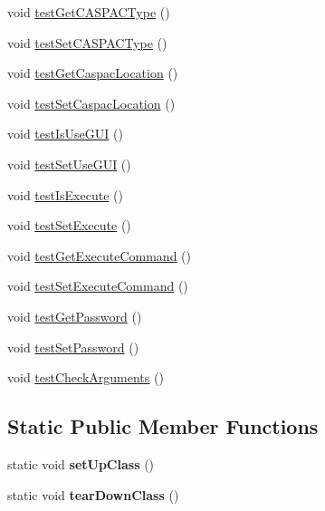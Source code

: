 \begin{DoxyCompactItemize}
\item 
void \hyperlink{class_c_a_s_u_a_l_1_1_c_a_s_u_a_l_settings_test_a80f2a239ee4bc31906209530c5e57f3e}{test\-Get\-C\-A\-S\-P\-A\-C\-Type} ()
\item 
void \hyperlink{class_c_a_s_u_a_l_1_1_c_a_s_u_a_l_settings_test_a4d50bccc0ef0264dac5cdf352ae3fb92}{test\-Set\-C\-A\-S\-P\-A\-C\-Type} ()
\item 
void \hyperlink{class_c_a_s_u_a_l_1_1_c_a_s_u_a_l_settings_test_a9df1e7305773780940e940e5dcdac817}{test\-Get\-Caspac\-Location} ()
\item 
void \hyperlink{class_c_a_s_u_a_l_1_1_c_a_s_u_a_l_settings_test_a7787083756c537f96f17db8af2e78066}{test\-Set\-Caspac\-Location} ()
\item 
void \hyperlink{class_c_a_s_u_a_l_1_1_c_a_s_u_a_l_settings_test_a6eb92e6a48fe040f7e649c0b2427421c}{test\-Is\-Use\-G\-U\-I} ()
\item 
void \hyperlink{class_c_a_s_u_a_l_1_1_c_a_s_u_a_l_settings_test_a12b3eb6a203c0f3d14312c47985aa82e}{test\-Set\-Use\-G\-U\-I} ()
\item 
void \hyperlink{class_c_a_s_u_a_l_1_1_c_a_s_u_a_l_settings_test_a247d12ed27750ec6f8045c4d170593cf}{test\-Is\-Execute} ()
\item 
void \hyperlink{class_c_a_s_u_a_l_1_1_c_a_s_u_a_l_settings_test_a1c7bd247785086e645e2c2de198cd548}{test\-Set\-Execute} ()
\item 
void \hyperlink{class_c_a_s_u_a_l_1_1_c_a_s_u_a_l_settings_test_a23666e147c04b15e31c3d720ba7b1d8d}{test\-Get\-Execute\-Command} ()
\item 
void \hyperlink{class_c_a_s_u_a_l_1_1_c_a_s_u_a_l_settings_test_a6ae87345be861107edee447cd9f9e375}{test\-Set\-Execute\-Command} ()
\item 
void \hyperlink{class_c_a_s_u_a_l_1_1_c_a_s_u_a_l_settings_test_ab1e8bc396686523822719443169b15f1}{test\-Get\-Password} ()
\item 
void \hyperlink{class_c_a_s_u_a_l_1_1_c_a_s_u_a_l_settings_test_aa91b274bdf0367ac0572ff33d6ff5ff2}{test\-Set\-Password} ()
\item 
void \hyperlink{class_c_a_s_u_a_l_1_1_c_a_s_u_a_l_settings_test_a42ca5fbef80b6db50acefbb431cd86ba}{test\-Check\-Arguments} ()
\end{DoxyCompactItemize}
\subsection*{Static Public Member Functions}
\begin{DoxyCompactItemize}
\item 
\hypertarget{class_c_a_s_u_a_l_1_1_c_a_s_u_a_l_settings_test_afa64dc9db01bf82efcf071c9309690b0}{static void {\bfseries set\-Up\-Class} ()}\label{class_c_a_s_u_a_l_1_1_c_a_s_u_a_l_settings_test_afa64dc9db01bf82efcf071c9309690b0}

\item 
\hypertarget{class_c_a_s_u_a_l_1_1_c_a_s_u_a_l_settings_test_a0ce9c5e55bb56b23842ea465dea725b9}{static void {\bfseries tear\-Down\-Class} ()}\label{class_c_a_s_u_a_l_1_1_c_a_s_u_a_l_settings_test_a0ce9c5e55bb56b23842ea465dea725b9}

\end{DoxyCompactItemize}


